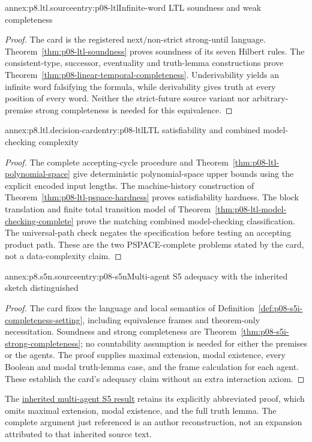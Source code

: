 \begin{annexitem}{annex:p8.ltl.source}{entry:p08-ltl}{Infinite-word LTL soundness and weak completeness}
\begin{proof}
The card is the registered next/non-strict strong-until language.
Theorem~\ref{thm:p08-ltl-soundness} proves soundness of its seven Hilbert
rules. The consistent-type, successor, eventuality and truth-lemma
constructions prove Theorem~\ref{thm:p08-linear-temporal-completeness}.
Underivability yields an infinite word falsifying the formula, while
derivability gives truth at every position of every word. Neither the
strict-future source variant nor arbitrary-premise strong completeness is
needed for this equivalence.
\end{proof}
\end{annexitem}

\begin{annexitem}{annex:p8.ltl.decision-card}{entry:p08-ltl}{LTL satisfiability and combined model-checking complexity}
\begin{proof}
The complete accepting-cycle procedure and
Theorem~\ref{thm:p08-ltl-polynomial-space} give deterministic polynomial-space
upper bounds using the explicit encoded input lengths. The machine-history
construction of Theorem~\ref{thm:p08-ltl-pspace-hardness} proves satisfiability
hardness. The block translation and finite total transition model of
Theorem~\ref{thm:p08-ltl-model-checking-complete} prove the matching combined
model-checking classification. The universal-path check negates the
specification before testing an accepting product path. These are the two
PSPACE-complete problems stated by the card, not a data-complexity claim.
\end{proof}
\end{annexitem}

\begin{annexitem}{annex:p8.s5n.source}{entry:p08-s5n}{Multi-agent S5 adequacy with the inherited sketch distinguished}
\begin{proof}
The card fixes the language and local semantics of
Definition~\ref{def:p08-s5i-completeness-setting}, including equivalence
frames and theorem-only necessitation. Soundness and strong completeness
are Theorem~\ref{thm:p08-s5i-strong-completeness}; no countability
assumption is needed for either the premises or the agents. The proof
supplies maximal extension, modal existence, every Boolean and modal
truth-lemma case, and the frame calculation for each agent. These establish
the card's adequacy claim without an extra interaction axiom.
\end{proof}
The \hyperref[thm:p08-source-s5n-adequacy]{inherited multi-agent S5 result}
retains its explicitly abbreviated proof, which omits maximal extension,
modal existence, and the full truth lemma. The complete argument just
referenced is an author reconstruction, not an expansion attributed to
that inherited source text.
\end{annexitem}

